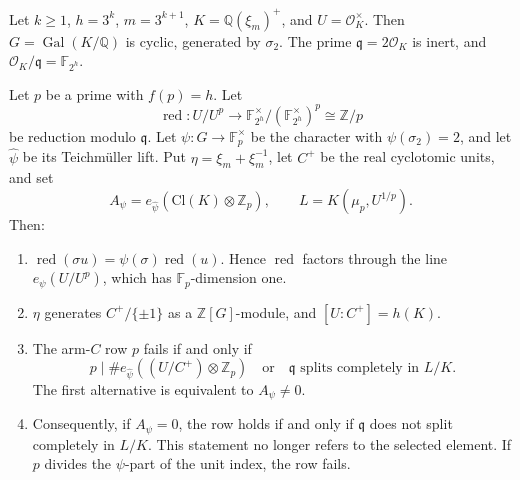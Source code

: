 \begin{theorem}
\label{thm:model-c}
Let $k\geq1$, $h=3^k$, $m=3^{k+1}$, $K=\mathbb Q(\xi_m)^+$, and
$U=\mathcal O_K^{\times}$.  Then $G=\operatorname{Gal}(K/\mathbb Q)$ is cyclic,
generated by $\sigma_2$.  The prime $\mathfrak q=2\mathcal O_K$ is inert, and
$\mathcal O_K/\mathfrak q=\mathbb F_{2^h}$.

Let $p$ be a prime with $f(p)=h$.  Let
\[
 \operatorname{red}:U/U^p\to\mathbb F_{2^h}^{\times}/(\mathbb F_{2^h}^{\times})^p
 \cong\mathbb Z/p
\]
be reduction modulo $\mathfrak q$.  Let $\psi:G\to\mathbb F_p^{\times}$ be
the character with $\psi(\sigma_2)=2$, and let $\hat\psi$ be its Teichm\"uller
lift.  Put $\eta=\xi_m+\xi_m^{-1}$, let $C^+$ be the real cyclotomic units,
and set
\[
 A_\psi=e_{\hat\psi}(\mathrm{Cl}(K)\otimes\mathbb Z_p),\qquad
 L=K(\mu_p,U^{1/p}).
\]
Then:
\begin{enumerate}
\item $\operatorname{red}(\sigma u)=\psi(\sigma)\operatorname{red}(u)$.
      Hence $\operatorname{red}$ factors through the line
      $e_\psi(U/U^p)$, which has $\mathbb F_p$-dimension one.
\item $\eta$ generates $C^+/\{\pm1\}$ as a $\mathbb Z[G]$-module, and
      $[U:C^+]=h(K)$.
\item The arm-$C$ row $p$ fails if and only if
      \[
       p\mid\#e_{\hat\psi}((U/C^+)\otimes\mathbb Z_p)
       \quad\text{or}\quad
       \mathfrak q\text{ splits completely in }L/K .
      \]
      The first alternative is equivalent to $A_\psi\neq0$.
\item Consequently, if $A_\psi=0$, the row holds if and only if $\mathfrak q$
      does not split completely in $L/K$.  This statement no longer refers to
      the selected element.  If $p$ divides the $\psi$-part of the unit
      index, the row fails.
\end{enumerate}
\end{theorem}

